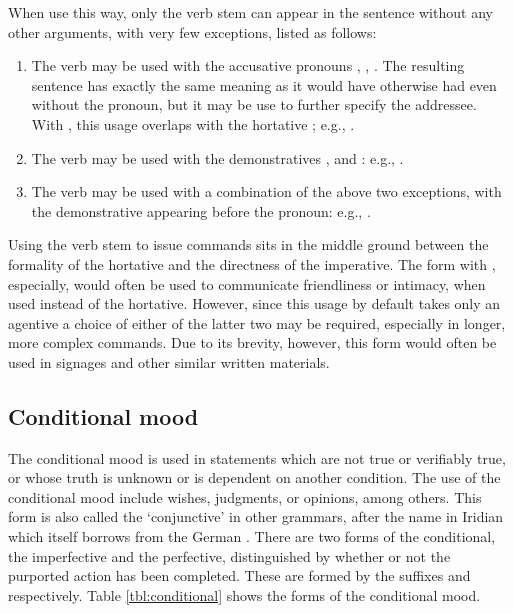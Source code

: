 When use this way, only the verb stem can appear in the sentence without any
other arguments, with very few exceptions, listed as follows:
\begin{enumerate}
	\item The verb may be used with the accusative pronouns , , . The resulting sentence
	has exactly the same meaning as it would have otherwise had even without the
	pronoun, but it may be use to further specify the addressee. With ,
	this usage overlaps with the hortative ; e.g., .
	\item The verb may be used with the demonstratives ,
	 and : e.g.,
	.
	\item The verb may be used with a combination of the above two exceptions,
	with the demonstrative appearing before the pronoun: e.g., .
\end{enumerate}

Using the verb stem to issue commands sits in the middle ground between the
formality of the hortative and the directness of the imperative. The form with
, especially, would often be used to communicate friendliness or
intimacy, when used instead of the hortative. However, since this usage by
default takes only an agentive a choice of either of the latter two may be
required, especially in longer, more complex commands. Due to its brevity,
however, this form would often be used in signages and other similar written
materials.

\subsection{Conditional mood}\label{sec:conditional}

The conditional mood is used in statements which are not true or verifiably
true, or whose truth is unknown or is dependent on another condition. The use of
the conditional mood include wishes, judgments, or opinions, among others. This
form is also called the `conjunctive' in other grammars, after the name in
Iridian  which itself borrows from the German
. There are two forms of the conditional, the imperfective
and the perfective, distinguished by whether or not the purported action has
been completed. These are formed by the suffixes  and 
respectively. Table \ref{tbl:conditional} shows the forms of the conditional
mood.

